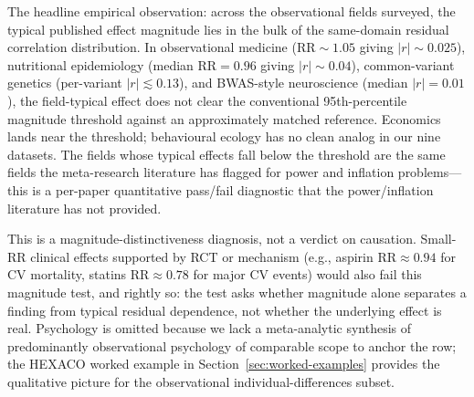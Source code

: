 The headline empirical observation: across the observational fields surveyed, the typical published effect magnitude lies in the bulk of the same-domain residual correlation distribution. In observational medicine ($\mathrm{RR}\sim 1.05$ giving $|r|\sim 0.025$), nutritional epidemiology (median $\mathrm{RR}=0.96$ giving $|r|\sim 0.04$), common-variant genetics (per-variant $|r|\lesssim 0.13$), and BWAS-style neuroscience (median $|r|=0.01$), the field-typical effect does not clear the conventional 95th-percentile magnitude threshold against an approximately matched reference. Economics lands near the threshold; behavioural ecology has no clean analog in our nine datasets. The fields whose typical effects fall below the threshold are the same fields the meta-research literature has flagged for power and inflation problems---this is a per-paper quantitative pass/fail diagnostic that the power/inflation literature has not provided.

This is a magnitude-distinctiveness diagnosis, not a verdict on causation. Small-RR clinical effects supported by RCT or mechanism (e.g., aspirin $\mathrm{RR}\approx 0.94$ for CV mortality, statins $\mathrm{RR}\approx 0.78$ for major CV events) would also fail this magnitude test, and rightly so: the test asks whether magnitude alone separates a finding from typical residual dependence, not whether the underlying effect is real. Psychology is omitted because we lack a meta-analytic synthesis of predominantly observational psychology of comparable scope to anchor the row; the HEXACO worked example in Section~\ref{sec:worked-examples} provides the qualitative picture for the observational individual-differences subset.
